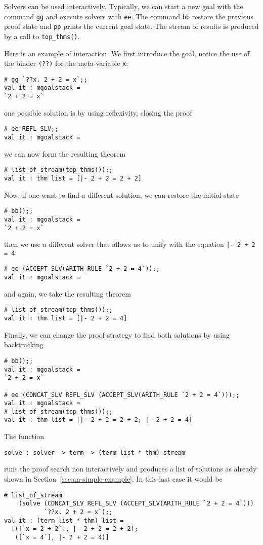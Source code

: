 Solvers can be used interactively.  Typically, we can start a new goal
with the command \verb|gg| and execute solvers with \verb|ee|.  The
command \verb|bb| restore the previous proof state and \verb|pp|
prints the current goal state.  The stream of results is produced by
a call to \verb|top_thms()|.

Here is an example of interaction.  We first introduce the goal,
notice the use of the binder \verb|(??)| for the meta-variable \verb|x|:
\begin{verbatim}
# gg `??x. 2 + 2 = x`;;
val it : mgoalstack =
`2 + 2 = x`
\end{verbatim}
one possible solution is by using reflexivity, closing the proof
\begin{verbatim}
# ee REFL_SLV;;
val it : mgoalstack =
\end{verbatim}
we can now form the resulting theorem
\begin{verbatim}
# list_of_stream(top_thms());;
val it : thm list = [|- 2 + 2 = 2 + 2]
\end{verbatim}

Now, if one want to find a different solution, we can restore the
initial state
\begin{verbatim}
# bb();;
val it : mgoalstack =
`2 + 2 = x`
\end{verbatim}
then we use a different solver that allows us to unify with the
equation \verb?|- 2 + 2 = 4?
\begin{verbatim}
# ee (ACCEPT_SLV(ARITH_RULE `2 + 2 = 4`));;
val it : mgoalstack =
\end{verbatim}
and again, we take the resulting theorem
\begin{verbatim}
# list_of_stream(top_thms());;
val it : thm list = [|- 2 + 2 = 4]
\end{verbatim}

Finally, we can change the proof strategy to find both solutions by
using backtracking
\begin{verbatim}
# bb();;
val it : mgoalstack =
`2 + 2 = x`

# ee (CONCAT_SLV REFL_SLV (ACCEPT_SLV(ARITH_RULE `2 + 2 = 4`)));;
val it : mgoalstack =
# list_of_stream(top_thms());;
val it : thm list = [|- 2 + 2 = 2 + 2; |- 2 + 2 = 4]
\end{verbatim}

The function
\begin{verbatim}
solve : solver -> term -> (term list * thm) stream
\end{verbatim}
runs the proof search non interactively and produces a list of
solutions as already shown in Section~\ref{sec:an-simple-example}.  In
this last case it would be
\begin{verbatim}
# list_of_stream
    (solve (CONCAT_SLV REFL_SLV (ACCEPT_SLV(ARITH_RULE `2 + 2 = 4`)))
           `??x. 2 + 2 = x`);;
val it : (term list * thm) list =
  [([`x = 2 + 2`], |- 2 + 2 = 2 + 2);
   ([`x = 4`], |- 2 + 2 = 4)]
\end{verbatim}

